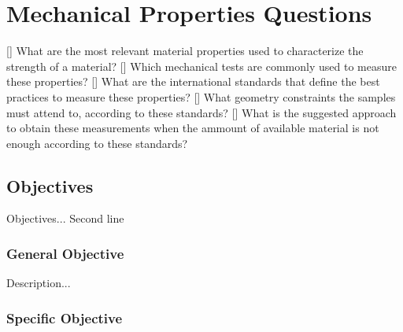 \chapter{Mechanical Properties Questions}

[] What are the most relevant material properties used to characterize the strength of a material?
[] Which mechanical tests are commonly used to measure these properties?
[] What are the international standards that define the best practices to measure these properties?
[] What geometry constraints the samples must attend to, according to these standards?
[] What is the suggested approach to obtain these measurements when the ammount of available material is not enough according to these standards?

\section{Objectives}

Objectives...
Second line

\subsection{General Objective}

Description...

\subsection{Specific Objective}

